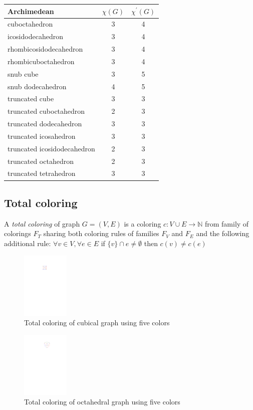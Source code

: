 \begin{center}
\begin{tabular}{|l|c|c|}
\hline
Archimedean & $\chi(G)$ & $\chi^{'}(G)$ \\
\hline\hline
cuboctahedron & 3 & 4 \\
\hline
icosidodecahedron & 3 & 4 \\
\hline
rhombicosidodecahedron & 3 & 4 \\
\hline
rhombicuboctahedron & 3 & 4 \\
\hline
snub cube & 3 & 5 \\
\hline
snub dodecahedron & 4 & 5 \\
\hline
truncated cube & 3 & 3 \\
\hline
truncated cuboctahedron & 2 & 3 \\
\hline
truncated dodecahedron & 3 & 3 \\
\hline
truncated icosahedron & 3 & 3 \\
\hline
truncated icosidodecahedron & 2 & 3 \\
\hline
truncated octahedron & 2 & 3 \\
\hline
truncated tetrahedron & 3 & 3 \\
\hline
\end{tabular}
\end{center}


\subsection{Total coloring}

\begin{definition}
    A \textit{total coloring} of graph $G=(V,E)$ is a coloring $c: V \cup E \rightarrow \mathbb{N}$ from family of colorings $F_T$ sharing both coloring rules of families $F_V$ and $F_E$ and the following additional rule: $\forall v \in V,  \forall e \in E$ if $\{v\} \cap e \neq \emptyset$ then $c(v) \neq c(e)$
\end{definition}

\begin{figure}[H]
    \centering
    \includegraphics[width=0.2\textwidth]{../Resources/Figs/cubical_tot_colr.pdf}
    \caption{Total coloring of cubical graph using five colors}
    \label{fig:cubical_tot_coloring}
\end{figure}

\begin{figure}[H]
    \centering
    \includegraphics[width=0.2\textwidth]{../Resources/Figs/octahedral_tot_colr.pdf}
    \caption{Total coloring of octahedral graph using five colors}
    \label{fig:octahedral_tot_coloring}
\end{figure}

